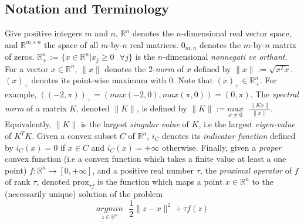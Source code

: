 \documentclass[a4paper,9pt,journal]{IEEEtran}
\begin{document}
\subsection{Notation and Terminology}
Give positive integers $m$ and $n$, $\mathbb{R}^{n}$ denotes the $n$-dimensional real vector space, and $\mathbb{R}^{m \times n}$
the space of all $m$-by-$n$ real matrices. $0_{m,n}$ denotes the $m$-by-$n$ matrix of zeros.
$\mathbb{R}^n_+$ := $\{x \in \mathbb{R}^n|x_j \ge 0 \text{ }  \forall j\}$ is the $n$-dimensional \textit{nonnegati
ve orthant}.
For a vector $x \in \mathbb{R}^n$, $\|x\|$ denotes the $2$-\textit{norm} of $x$ defined by $\|x\| := \sqrt{x^Tx}$.
$(x)_+$ denotes its point-wise maximum with 0. Note that $(x)_+ \in \mathbb{R}^n_+$.
For example, $((-2, \pi))_+ = (max(-2, 0), max(\pi, 0)) = (0, \pi)$. The \textit{spectral norm} of a matrix $K$, denoted $\|K\|$, is defined by
$\|K\| := \underset{x \ne 0}{max}\text{ }\frac{\|Kx\|}{\|x\|}$. Equivalently, $\|K\|$ is the largest \textit{singular value} of $K$, i.e the largest
\textit{eigen-value} of $K^TK$. Given a convex subset $C$ of $\mathbb{R}^n$, $i_C$ denotes its \textit{indicator function} defined by
$i_C(x) = 0$ if $x \in C$ and $i_C(x) = +\infty$ otherwise. Finally, given a \textit{proper} convex function (i.e a convex function which takes a finite
value at least a one point) $f : \mathbb{R}^n \rightarrow [0, +\infty]$, and a positive real number $\tau$, the \textit{proximal operator} of $f$ of rank $\tau$,
denoted $\text{prox}_{\tau f}$ is the function which maps a point $x \in \mathbb{R}^n$ to the (necessarily unique) solution of the problem
\begin{equation}
  \underset{z \in \mathbb{R}^n}{argmin}\text{ }\frac{1}{2}\|z - x\|^2 + \tau f(z)
\end{equation}
\end{document}
